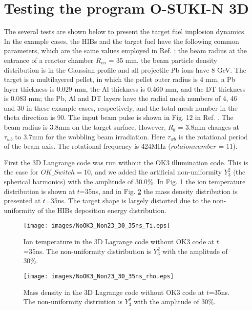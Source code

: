 %

\section{Testing the program O-SUKI-N 3D}
The several tests are shown below to present the target fuel implosion dynamics. In the example cases, the HIBs and the target fuel have the following common parameters, which are the same values employed in Ref. \cite{CPC-O-SUKI}: the beam radius at the entrance of a reactor chamber $R_{en}$ = 35 mm, the beam particle density distribution is in the Gaussian profile and all projectile Pb ions have 8 GeV. The target is a multilayered pellet, in which the pellet outer radius is 4 mm, a Pb layer thickness is 0.029 mm, the Al thickness is 0.460 mm, and the DT thickness is 0.083 mm; the Pb, Al and DT layers have the radial mesh numbers of 4, 46 and 30 in these example cases, respectively, and the total mesh number in the theta direction is 90. The input beam pulse is shown in Fig. 12 in Ref. \cite{CPC-O-SUKI}. The beam radius is 3.8mm on the target surface. However, $R_b$ = 3.8mm changes at $\tau_{wb}$ to 3.7mm for the wobbling beam irradiation. Here $\tau_{wb}$ is the rotational period of the beam axis. The rotational frequency is 424MHz ($rotaionnumber$ = 11). 






First the 3D Langrange code was run without the OK3 illumination code. This is the case for $OK\_Switch=10$, and we added the artificial non-uniformity $Y_3^2$ (the spherical harmonics) with the amplitude of $30.0\%$. In Fig. \ref{NoOK3_23_Ti} the ion temperature distribution is shown at $t$=35ns, and in Fig. \ref{NoOK3_23_rho} the mass density distribution is presented at $t$=35ns. The target shape is largely distorted due to the non-uniformity of the HIBs deposition energy distribution.  


\begin{figure}[H]
		\centering
		\texttt{[image: images/NoOK3\_Non23\_30\_35ns\_Ti.eps]}
		\caption{Ion temperature in the 3D Lagrange code without OK3 code at $t$=35ns. The non-uniformity distiribution is $Y_3^2$ with the amplitude of $30\%$.}\label{NoOK3_23_Ti}
\end{figure}
\begin{figure}[H]
		\centering
		\texttt{[image: images/NoOK3\_Non23\_30\_35ns\_rho.eps]}
		\caption{Mass density in the 3D Lagrange code without OK3 code at $t$=35ns. The non-uniformity distriution is $Y_3^2$ with the amplitude of $30\%$.}\label{NoOK3_23_rho}
\end{figure}


